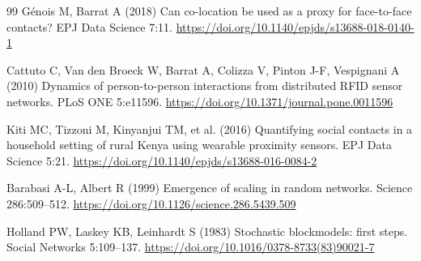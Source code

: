 \documentclass[smallextended]{svjour3}
\begin{document}
\begin{thebibliography}{99}
 Génois M, Barrat A (2018) Can co-location be used as a proxy for face-to-face contacts? EPJ Data Science 7:11. \url{https://doi.org/10.1140/epjds/s13688-018-0140-1}

 Cattuto C, Van den Broeck W, Barrat A, Colizza V, Pinton J-F, Vespignani A (2010) Dynamics of person-to-person interactions from distributed RFID sensor networks. PLoS ONE 5:e11596. \url{https://doi.org/10.1371/journal.pone.0011596}

 Kiti MC, Tizzoni M, Kinyanjui TM, et al. (2016) Quantifying social contacts in a household setting of rural Kenya using wearable proximity sensors. EPJ Data Science 5:21. \url{https://doi.org/10.1140/epjds/s13688-016-0084-2}

 Barabasi A-L, Albert R (1999) Emergence of scaling in random networks. Science 286:509--512. \url{https://doi.org/10.1126/science.286.5439.509}

 Holland PW, Laskey KB, Leinhardt S (1983) Stochastic blockmodels: first steps. Social Networks 5:109--137. \url{https://doi.org/10.1016/0378-8733(83)90021-7}
\end{thebibliography}
\end{document}
